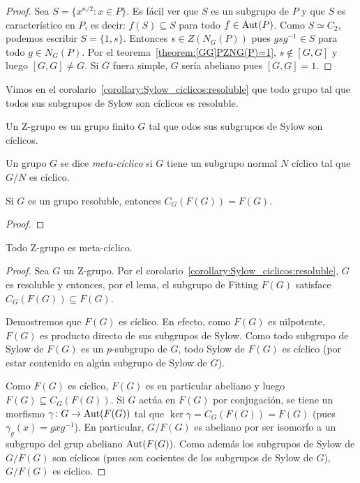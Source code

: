 \begin{proof}
	Sea $S=\{x^{n/2}:x\in P\}$. Es fácil ver que $S$ es un subgrupo de $P$ y
	que $S$ es característico en $P$, es decir: $f(S)\subseteq S$ para todo
	$f\in\operatorname{Aut}(P)$. Como $S\simeq C_2$, podemos escribir $S=\{1,s\}$. Entonces
	$s\in Z(N_G(P))$ pues $gsg^{-1}\in S$ para todo $g\in N_G(P)$. Por el
	teorema~\ref{theorem:[GG]PZNG(P)=1}, $s\not\in[G,G]$ y luego $[G,G]\ne G$.
	Si $G$ fuera simple, $G$ sería abeliano pues $[G,G]=1$.
\end{proof}

Vimos en el corolario~\ref{corollary:Sylow_ciclicos:resoluble} que todo grupo
tal que todos sus subgrupos de Sylow son cíclicos es resoluble.

\begin{definition}
	Un Z-grupo es un grupo finito $G$ tal que 
	odos sus subgrupos de Sylow son
	cíclicos.
\end{definition}

Un grupo $G$ se dice \emph{meta-cíclico} si $G$ tiene un subgrupo normal $N$
cíclico tal que $G/N$ es cíclico.

\begin{lemma}
	Si $G$ es un grupo resoluble, entonces $C_G(F(G))=F(G)$.
\end{lemma}

\begin{proof}
	
\end{proof}

\begin{theorem}
	\label{theorem:Z=>metacyclic}
	Todo Z-grupo es meta-cíclico.
\end{theorem}

\begin{proof}
	Sea $G$ un Z-grupo.	Por el
	corolario~\ref{corollary:Sylow_ciclicos:resoluble}, $G$ es resoluble y
	entonces, por el lema, el subgrupo de Fitting $F(G)$ satisface
	$C_G(F(G))\subseteq F(G)$. 
	
	Demostremos que $F(G)$ es cíclico. En efecto, como $F(G)$ es nilpotente,
	$F(G)$ es producto directo de sus subgrupos de Sylow. Como todo subgrupo de
	Sylow de $F(G)$ es un $p$-subgrupo de $G$, todo Sylow de $F(G)$ es cíclico
	(por estar contenido en algún subgrupo de Sylow de $G$). 

	Como $F(G)$ es cíclico, $F(G)$ es en particular abeliano y luego
	$F(G)\subseteq C_G(F(G))$. Si $G$ actúa en $F(G)$ por conjugación, se tiene
	un morfismo $\gamma\colon G\to\operatorname{Aut}(F(G))$ tal que
	$\ker\gamma=C_G(F(G))=F(G)$ (pues $\gamma_g(x)=gxg^{-1}$). En particular,
	$G/F(G)$ es abeliano por ser isomorfo a un subgrupo del grup abeliano
	$\operatorname{Aut}(F(G))$. Como además los subgrupos de Sylow de $G/F(G)$ son cíclicos (pues
	son cocientes de los subgrupos de Sylow de $G$), $G/F(G)$ es cíclico.
\end{proof}

